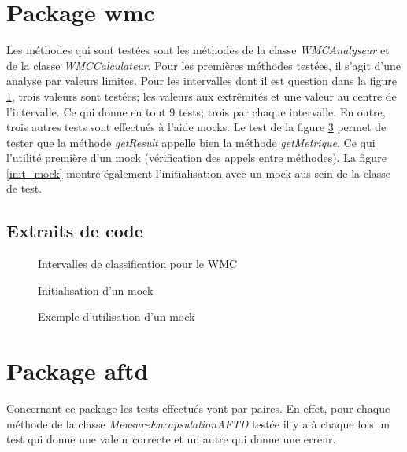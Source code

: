\documentclass[11pt]{report}
\begin{document}
	\section{Package wmc}
		Les méthodes qui sont testées sont les méthodes de la classe \textit{WMCAnalyseur} et de la classe \textit{WMCCalculateur}. Pour les premières méthodes testées, il s'agit d'une analyse par valeurs limites. Pour les intervalles dont il est question dans la figure \ref{int}, trois valeurs sont testées; les valeurs aux extrêmités et une valeur au centre de l'intervalle. Ce qui donne en tout 9 tests; trois par chaque intervalle. En outre, trois autres tests sont effectués à l'aide mocks. Le test de la figure \ref{mock} permet de tester que la méthode \textit{getResult} appelle bien la méthode \textit{getMetrique}. Ce qui l'utilité première d'un mock (vérification des appels entre méthodes). La figure \ref{init_mock} montre également l'initialisation avec un mock aus sein de la classe de test. 
		
		\subsection{Extraits de code}
		
		\begin{figure}[h]
			\centering
			\caption{Intervalles de classification pour le WMC}
			\label{int}
		\end{figure}
		
		\begin{figure}[h]
			\centering
			\caption{Initialisation d'un mock}
			\label{mock}
		\end{figure}
		
		\begin{figure}[h]
			\centering
			\caption{Exemple d'utilisation d'un mock}
			\label{mock}
		\end{figure}
		
	\newpage
	\section{Package aftd}
		Concernant ce package les tests effectués vont par paires. En effet, pour chaque méthode de la classe \textit{MeusureEncapsulationAFTD} testée il y a à chaque fois un test qui donne une valeur correcte et un autre qui donne une erreur.
		
\end{document}
